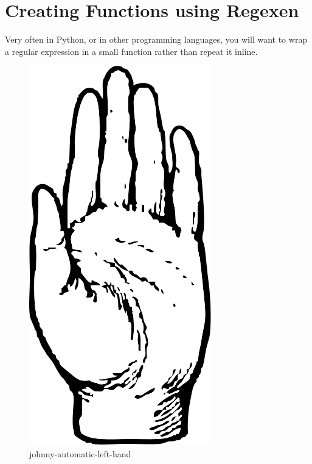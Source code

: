\begin{Shaded}
\begin{Highlighting}[]
\OperatorTok{=}\NormalTok{  (}
         \NormalTok{)}

\OperatorTok{=}\NormalTok{  (}
         \NormalTok{)}
\end{Highlighting}
\end{Shaded}

\hypertarget{creating-functions-using-regexen}{%
\chapter{Creating Functions using
Regexen}\label{creating-functions-using-regexen}}

Very often in Python, or in other programming languages, you will want
to wrap a regular expression in a small function rather than repeat it
inline.

\begin{figure}
\centering
\includegraphics{images/johnny-automatic-left-hand.svg}
\caption{johnny-automatic-left-hand}
\end{figure}

